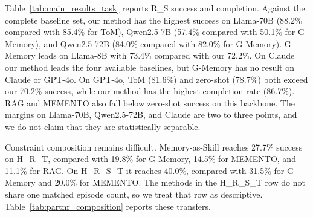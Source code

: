 \documentclass{article}
\theoremstyle{plain}
\theoremstyle{definition}
\theoremstyle{remark}
\begin{document}
Table~\ref{tab:main_results_task} reports R\_S success and completion. Against the complete baseline set, our method has the highest success on Llama-70B (88.2\% compared with 85.4\% for ToM), Qwen2.5-7B (57.4\% compared with 50.1\% for G-Memory), and Qwen2.5-72B (84.0\% compared with 82.0\% for G-Memory). G-Memory leads on Llama-8B with 73.4\% compared with our 72.2\%. On Claude our method leads the four available baselines, but G-Memory has no result on Claude or GPT-4o. On GPT-4o, ToM (81.6\%) and zero-shot (78.7\%) both exceed our 70.2\% success, while our method has the highest completion rate (86.7\%). RAG and MEMENTO also fall below zero-shot success on this backbone. The margins on Llama-70B, Qwen2.5-72B, and Claude are two to three points, and we do not claim that they are statistically separable.

Constraint composition remains difficult. Memory-as-Skill reaches 27.7\% success on H\_R\_T, compared with 19.8\% for G-Memory, 14.5\% for MEMENTO, and 11.1\% for RAG. On H\_R\_S\_T it reaches 40.0\%, compared with 31.5\% for G-Memory and 20.0\% for MEMENTO. The methods in the H\_R\_S\_T row do not share one matched episode count, so we treat that row as descriptive. Table~\ref{tab:partnr_composition} reports these transfers.

\begin{table}[H]
\centering
\caption{PARTNR transfer results with Llama-3.1-8B (success \%, $\uparrow$, best in bold). R\_S (R-only) is the setting reported in Table~\ref{tab:main_results_task}. R\_S (R+S) and the 3-/4-constraint rows are compositional transfers. H\_R\_S\_T uses the complete source union R+S+H\_R+H\_T.}
\label{tab:partnr_composition}
\end{table}
\end{document}
